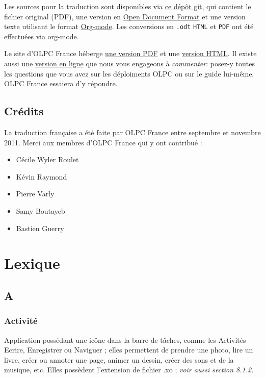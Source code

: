 \documentclass[12pt]{article}
\begin{document}
Les sources pour la traduction sont disponibles via \href{https://github.com/bzg/OLPC-Deployment--community--guide}{ce dépôt git}, qui
contient le fichier original (PDF), une version en \href{http://fr.wikipedia.org/wiki/OpenDocument}{Open Document Format} et
une version texte utilisant le format \href{http://orgmode.org}{Org-mode}.  Les conversions en \texttt{.odt}
\texttt{HTML} et \texttt{PDF} ont été effectuées via org-mode.

Le site d'OLPC France héberge \href{http://olpc-france.org/guide-deploiement/olpc-guide-deploiement.pdf}{une version PDF} et une \href{http://olpc-france.org/guide-deploiement/olpc-guide-deploiement.html}{version HTML}.  Il
existe aussi une \href{http://olpc-france.org/guide-deploiement/index.html}{version en ligne} que nous vous engageons à \emph{commenter}:
posez-y toutes les questions que vous avez sur les déploiments OLPC ou 
sur le guide lui-même, OLPC France essaiera d'y répondre.
\subsection{Crédits}
\label{sec-13-3}


La traduction française a été faite par OLPC France entre septembre et
novembre 2011.  Merci aux membres d'OLPC France qui y ont contribué :

\begin{itemize}
\item Cécile Wyler Roulet
\item Kévin Raymond
\item Pierre Varly
\item Samy Boutayeb
\item Bastien Guerry
\end{itemize}
\section{Lexique}
\label{sec-14}
\subsection{A}
\label{sec-14-1}
\subsubsection{Activité}
\label{sec-14-1-1}


Application possédant une icône dans la barre de tâches, comme les
Activités Ecrire, Enregistrer ou Naviguer ; elles permettent de prendre une
photo, lire un livre, créer ou annoter une page, animer un dessin, créer
des sons et de la musique, etc. Elles possèdent l'extension de fichier .xo
; \emph{voir aussi section 8.1.2.}
\end{document}
